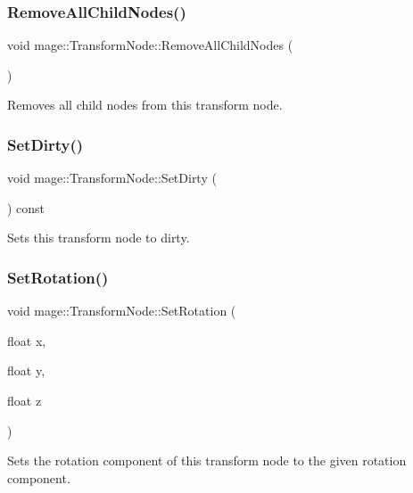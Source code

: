 \subsubsection{\texorpdfstring{Remove\+All\+Child\+Nodes()}{RemoveAllChildNodes()}}
{\footnotesize\ttfamily void mage\+::\+Transform\+Node\+::\+Remove\+All\+Child\+Nodes (\begin{DoxyParamCaption}{ }\end{DoxyParamCaption})\hspace{0.3cm}{\ttfamily [private]}}

Removes all child nodes from this transform node. \hypertarget{classmage_1_1_transform_node_a333a00b67bde653ffe76b5fa6f240223}{}\label{classmage_1_1_transform_node_a333a00b67bde653ffe76b5fa6f240223} 
\subsubsection{\texorpdfstring{Set\+Dirty()}{SetDirty()}}
{\footnotesize\ttfamily void mage\+::\+Transform\+Node\+::\+Set\+Dirty (\begin{DoxyParamCaption}{ }\end{DoxyParamCaption}) const\hspace{0.3cm}{\ttfamily [private]}}

Sets this transform node to dirty. \hypertarget{classmage_1_1_transform_node_a1f0f355c51e906eabc6aa2a17706ac50}{}\label{classmage_1_1_transform_node_a1f0f355c51e906eabc6aa2a17706ac50} 
\subsubsection{\texorpdfstring{Set\+Rotation()}{SetRotation()}\hspace{0.1cm}{\footnotesize\ttfamily [1/3]}}
{\footnotesize\ttfamily void mage\+::\+Transform\+Node\+::\+Set\+Rotation (\begin{DoxyParamCaption}\item[{float}]{x,  }\item[{float}]{y,  }\item[{float}]{z }\end{DoxyParamCaption})}

Sets the rotation component of this transform node to the given rotation component.



